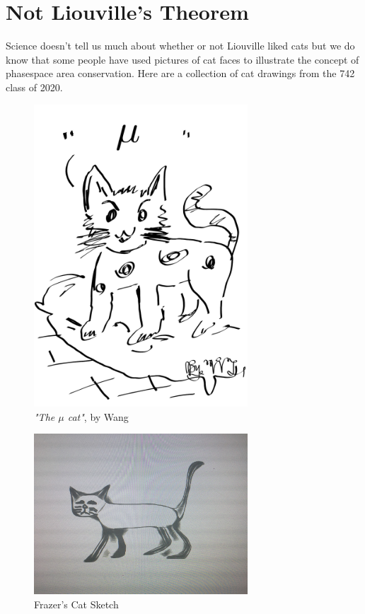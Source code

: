 \section{Not Liouville's Theorem}
Science doesn't tell us much about whether or not Liouville liked cats but we do know that some people have used pictures of cat faces to illustrate the concept of phasespace area conservation. 
Here are a collection of cat drawings from the 742 class of 2020.


\begin{centering}
\begin{figure}\centering
	\includegraphics[width=8cm]{mucat.pdf}
  \caption{\textsl{"The $\mu$ cat"}, by Wang}
  \label{fig:cat_wang}
\end{figure}

\begin{figure}
	\includegraphics[width=8cm]{catsketch.pdf}
  \caption{Frazer's Cat Sketch}
  \label{fig:catsketch}
\end{figure}


\end{centering}
